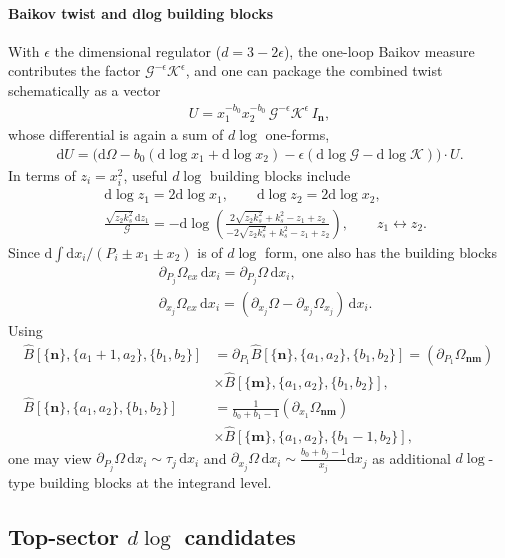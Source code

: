 \documentclass[a4paper,12pt]{article}
\newcommand{\n}{\nonumber}
\def\di{{\mathrm{d}}}
\def\ep{\epsilon}
\newcommand{\mG}{\mathcal{G}}
\newcommand{\mK}{\mathcal{K}}
\begin{document}
\paragraph{Baikov twist and dlog building blocks}
With $\ep$ the dimensional regulator ($d=3-2\ep$), the one-loop Baikov measure contributes the factor $\mG^{-\ep}\mK^{\ep}$, and one can package the combined twist schematically as a vector
\begin{align}
	U = x_1^{-b_0}x_2^{-b_0}\,\mG^{-\ep}\mK^{\ep}\,I_{\bm n},
\end{align}
whose differential is again a sum of $d\log$ one-forms,
\begin{align}
	\di U=\Big(\di\Omega-b_0(\di\log x_1+\di\log x_2)-\ep(\di\log \mG-\di\log \mK)\Big)\cdot U.
\end{align}
In terms of $z_i=x_i^2$, useful $d\log$ building blocks include
\begin{align}
	&\di\log z_1=2\di\log x_1,\qquad \di\log z_2=2\di\log x_2,\n\\
	&\frac{\sqrt{z_2 k_s^2}\,\di z_1}{\mG}
	= - \di \log \left(\frac{2 \sqrt{z_2 k_s^2}+k_s^2-z_1+z_2}{-2 \sqrt{z_2 k_s^2}+k_s^2-z_1+z_2}\right),
	\qquad z_1\leftrightarrow z_2.
\end{align}
Since $\di\!\int \di x_i/(P_i\pm x_1\pm x_2)$ is of $d\log$ form, one also has the building blocks
\begin{align}
	&\partial_{P_j}\Omega_{ex}\,\di x_i = \partial_{P_j}\Omega\,\di x_i, \n\\
	&\partial_{x_j}\Omega_{ex}\,\di x_i = (\partial_{x_j}\Omega-\partial_{x_j}\Omega_{x_j})\,\di x_i.
\end{align}
Using
\begin{align}
	\hat{B}[\{\bm{n}\},\{a_1+1,a_2\},\{b_1,b_2\}]
	&=\partial_{P_1}\hat{B}[\{\bm{n}\},\{a_1,a_2\},\{b_1,b_2\}]
	=\left(\partial_{P_1}\Omega_{\bm n\bm m}\right)\,\n\\
	&\times \hat{B}[\{\bm{m}\},\{a_1,a_2\},\{b_1,b_2\}], \n\\
	\hat{B}[\{\bm{n}\},\{a_1,a_2\},\{b_1,b_2\}]
	&=\frac{1}{b_0+b_1-1}\left(\partial_{x_1}\Omega_{\bm n\bm m}\right)\,\n\\
	&\times \hat{B}[\{\bm{m}\},\{a_1,a_2\},\{b_1-1,b_2\}],
\end{align}
one may view $\partial_{P_j}\Omega\,\di x_i\sim \tau_j\,\di x_i$ and
$\partial_{x_j}\Omega\,\di x_i\sim \frac{b_0+b_j-1}{x_j}\di x_j$
as additional $d\log$-type building blocks at the integrand level.

\subsection{Top-sector \texorpdfstring{$d\log$}{dlog} candidates}
\end{document}
